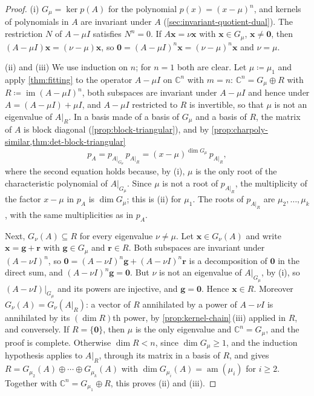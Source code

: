 \begin{proof}
(i) $G_\mu=\ker p(A)$ for the polynomial $p(x)=(x-\mu)^n$, and kernels of polynomials in $A$ are invariant under $A$ (\cref{sec:invariant-quotient-dual}). The restriction $N$ of $A-\mu I$ satisfies $N^n=0$. If $A\mathbf x=\nu\mathbf x$ with $\mathbf x\in G_\mu$, $\mathbf x\ne\mathbf 0$, then $(A-\mu I)\mathbf x=(\nu-\mu)\mathbf x$, so $\mathbf 0=(A-\mu I)^n\mathbf x=(\nu-\mu)^n\mathbf x$ and $\nu=\mu$.

(ii) and (iii) We use induction on $n$; for $n=1$ both are clear. Let $\mu\coloneqq\mu_1$ and apply \cref{thm:fitting} to the operator $A-\mu I$ on $\mathbb C^n$ with $m=n$: $\mathbb C^n=G_\mu\oplus R$ with $R\coloneqq\operatorname{im}(A-\mu I)^n$, both subspaces are invariant under $A-\mu I$ and hence under $A=(A-\mu I)+\mu I$, and $A-\mu I$ restricted to $R$ is invertible, so that $\mu$ is not an eigenvalue of $A|_R$. In a basis made of a basis of $G_\mu$ and a basis of $R$, the matrix of $A$ is block diagonal (\cref{prop:block-triangular}), and by \cref{prop:charpoly-similar,thm:det-block-triangular}
\[
p_A=p_{A|_{G_\mu}}\,p_{A|_R}=(x-\mu)^{\dim G_\mu}\,p_{A|_R} ,
\]
where the second equation holds because, by (i), $\mu$ is the only root of the characteristic polynomial of $A|_{G_\mu}$. Since $\mu$ is not a root of $p_{A|_R}$, the multiplicity of the factor $x-\mu$ in $p_A$ is $\dim G_\mu$; this is (ii) for $\mu_1$. The roots of $p_{A|_R}$ are $\mu_2,\ldots,\mu_k$, with the same multiplicities as in $p_A$.

Next, $G_\nu(A)\subseteq R$ for every eigenvalue $\nu\ne\mu$. Let $\mathbf x\in G_\nu(A)$ and write $\mathbf x=\mathbf g+\mathbf r$ with $\mathbf g\in G_\mu$ and $\mathbf r\in R$. Both subspaces are invariant under $(A-\nu I)^n$, so $\mathbf 0=(A-\nu I)^n\mathbf g+(A-\nu I)^n\mathbf r$ is a decomposition of $\mathbf 0$ in the direct sum, and $(A-\nu I)^n\mathbf g=\mathbf 0$. But $\nu$ is not an eigenvalue of $A|_{G_\mu}$, by (i), so $(A-\nu I)|_{G_\mu}$ and its powers are injective, and $\mathbf g=\mathbf 0$. Hence $\mathbf x\in R$. Moreover $G_\nu(A)=G_\nu(A|_R)$: a vector of $R$ annihilated by a power of $A-\nu I$ is annihilated by its $(\dim R)$th power, by \cref{prop:kernel-chain}\,(iii) applied in $R$, and conversely. If $R=\{\mathbf 0\}$, then $\mu$ is the only eigenvalue and $\mathbb C^n=G_\mu$, and the proof is complete. Otherwise $\dim R<n$, since $\dim G_\mu\ge1$, and the induction hypothesis applies to $A|_R$, through its matrix in a basis of $R$, and gives $R=G_{\mu_2}(A)\oplus\cdots\oplus G_{\mu_k}(A)$ with $\dim G_{\mu_i}(A)=\operatorname{am}(\mu_i)$ for $i\ge2$. Together with $\mathbb C^n=G_{\mu_1}\oplus R$, this proves (ii) and (iii).
\end{proof}

